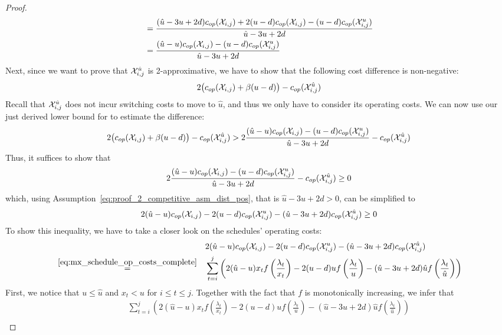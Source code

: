 \begin{proof}
\begin{align*}
	&=\frac{(\hat{u}-3u+2d)c_{op}(\mathcal{X}_{i,j})+2(u-d)c_{op}(\mathcal{X}_{i,j})-(u-d)c_{op}(\mathcal{X}_{i,j}^u)}{\hat{u}-3u+2d}\\
	&=\frac{(\hat{u}-u)c_{op}(\mathcal{X}_{i,j})-(u-d)c_{op}(\mathcal{X}_{i,j}^u)}{\hat{u}-3u+2d}
\end{align*}
Next, since we want to prove that $\mathcal{X}_{i,j}^{\hat{u}}$ is 2-approximative, we have to show that the following cost difference is non-negative:
\begin{align*}
	2\bigl(c_{op}(\mathcal{X}_{i,j})+\beta(u-d)\bigr)-c_{op}(\mathcal{X}_{i,j}^{\hat{u}})
\end{align*}
Recall that $\mathcal{X}_{i,j}^{\hat{u}}$ does not incur switching costs to move to $\hat{u}$, and thus we only have to consider its operating costs.
We can now use our just derived lower bound for  to estimate the difference:
\begin{align*}
	2\bigl(c_{op}(\mathcal{X}_{i,j})+\beta(u-d)\bigr)-c_{op}(\mathcal{X}_{i,j}^{\hat{u}})>2\frac{(\hat{u}-u)c_{op}(\mathcal{X}_{i,j})-(u-d)c_{op}(\mathcal{X}_{i,j}^u)}{\hat{u}-3u+2d}-c_{op}(\mathcal{X}_{i,j}^{\hat{u}})
\end{align*}
Thus, it suffices to show that
\begin{align*}
	2\frac{(\hat{u}-u)c_{op}(\mathcal{X}_{i,j})-(u-d)c_{op}(\mathcal{X}_{i,j}^u)}{\hat{u}-3u+2d}-c_{op}(\mathcal{X}_{i,j}^{\hat{u}})\ge 0
\end{align*}
which, using Assumption~\eqref{eq:proof_2_competitive_asm_dist_pos}, that is $\hat{u}-3u+2d>0$, can be simplified to
\begin{equation*}
	2(\hat{u}-u)c_{op}(\mathcal{X}_{i,j})-2(u-d)c_{op}(\mathcal{X}_{i,j}^u)-(\hat{u}-3u+2d)c_{op}(\mathcal{X}_{i,j}^{\hat{u}})\ge 0
\end{equation*}
To show this inequality, we have to take a closer look on the schedules' operating costs:
\begin{align*}
	&&&2(\hat{u}-u)c_{op}(\mathcal{X}_{i,j})-2(u-d)c_{op}(\mathcal{X}_{i,j}^u)-(\hat{u}-3u+2d)c_{op}(\mathcal{X}_{i,j}^{\hat{u}})\\
	&\stackrel{\eqref{eq:mx_schedule_op_costs_complete}}{=}&&\sum\limits_{t=i}^j\left(2(\hat{u}-u)x_tf\left(\frac{\lambda_t}{x_t}\right)-2(u-d)uf\left(\frac{\lambda_t}{u}\right)-(\hat{u}-3u+2d)\hat{u}f\left(\frac{\lambda_t}{\hat{u}}\right)\right)
\end{align*}
First, we notice that $u\le\hat{u}$ and $x_t<u$ for $i\le t\le j$. Together with the fact that $f$ is monotonically increasing, we infer that
\begin{align*}
	&&&\sum\limits_{t=i}^j\left(2(\hat{u}-u)x_tf\left(\frac{\lambda_t}{x_t}\right)-2(u-d)uf\left(\frac{\lambda_t}{u}\right)-(\hat{u}-3u+2d)\hat{u}f\left(\frac{\lambda_t}{\hat{u}}\right)\right)\\

\end{align*}
\end{proof}
